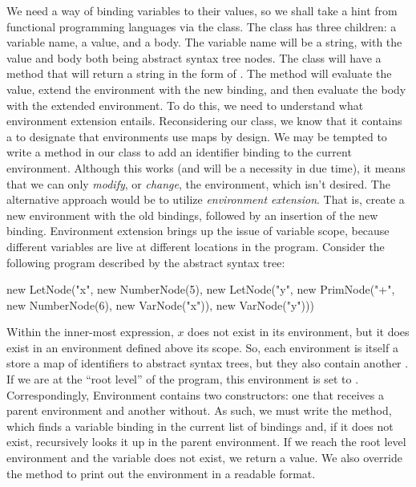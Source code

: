 We need a way of binding variables to their values, so we shall take a hint from functional programming languages via the  class. The  class has three children: a variable name, a value, and a body. The variable name will be a string, with the value and body both being abstract syntax tree nodes. The  class will have a  method that will return a string in the form of . The  method will evaluate the value, extend the environment with the new binding, and then evaluate the body with the extended environment. To do this, we need to understand what environment extension entails. Reconsidering our  class, we know that it contains a  to designate that environments use maps by design. We may be tempted to write a  method in our  class to add an identifier binding to the current environment. Although this works (and will be a necessity in due time), it means that we can only \emph{modify}, or \emph{change}, the environment, which isn't desired. The alternative approach would be to utilize \emph{environment extension}. That is, create a new environment with the old bindings, followed by an insertion of the new binding. Environment extension brings up the issue of variable scope, because different variables are live at different locations in the program. Consider the following program described by the abstract syntax tree:

\begin{verbnobox}[\small]
new LetNode("x", new NumberNode(5), 
 new LetNode("y", new PrimNode("+", new NumberNode(6), new VarNode("x")), 
  new VarNode("y")))
\end{verbnobox}
  
Within the inner-most  expression, $x$ does not exist in its environment, but it does exist in an environment defined above its scope. So, each environment is itself a store a map of identifiers to abstract syntax trees, but they also contain another . If we are at the ``root level'' of the program, this environment is set to . Correspondingly, Environment contains two constructors: one that receives a parent environment and another without. As such, we must write the  method, which finds a variable binding in the current list of bindings and, if it does not exist, recursively looks it up in the parent environment. If we reach the root level environment and the variable does not exist, we return a  value. We also override the  method to print out the environment in a readable format.

